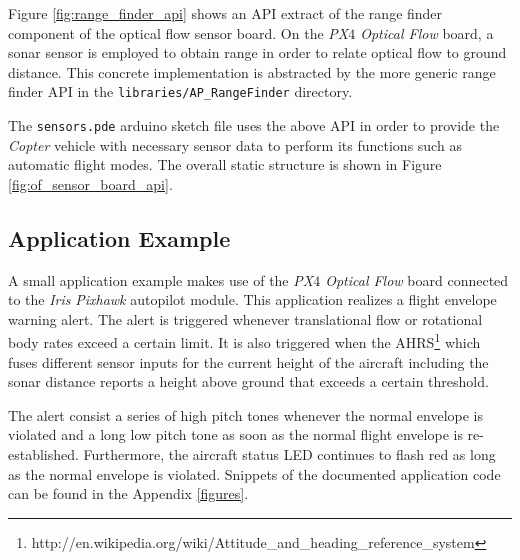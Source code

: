 \documentclass[paper=letter, fontsize=11pt]{scrartcl}
\numberwithin{equation}{section}
\numberwithin{figure}{section}
\numberwithin{table}{section}
\begin{document}
\par
Figure \ref{fig:range_finder_api} shows an \ac{API} extract of the range finder
component of the optical flow sensor board. On the {\em PX$4$ Optical Flow}
board, a sonar sensor is employed to obtain range in order to relate optical
flow to ground distance. This concrete implementation is abstracted by the
more generic range finder \ac{API} in the \texttt{libraries/AP\_RangeFinder}
directory.
\newline

\par
The \texttt{sensors.pde} arduino sketch file uses the above \ac{API} in order
to provide the {\em Copter} vehicle with necessary sensor data to perform its
functions such as automatic flight modes. The overall static structure is shown
in Figure \ref{fig:of_sensor_board_api}.
\newline

\subsection{Application Example}
\label{sec:application_example}
\par
A small application example makes use of the {\em PX$4$ Optical Flow} board
connected to the {\em Iris} {\em Pixhawk} autopilot module. This application
realizes a flight envelope warning alert. The alert is triggered whenever
translational flow or rotational body rates exceed a certain limit. It is
also triggered when the \ac{AHRS}\footnote{
http://en.wikipedia.org/wiki/Attitude\_and\_heading\_reference\_system}
which fuses different sensor inputs for the current height of the aircraft
including the sonar distance reports a height above ground that exceeds a
certain threshold.
\newline

\par
The alert consist a series of high pitch tones whenever the normal envelope
is violated and a long low pitch tone as soon as the normal flight envelope
is re-established. Furthermore, the aircraft status \ac{LED} continues to
flash red as long as the normal envelope is violated. Snippets of the
documented application code can be found in the Appendix \ref{figures}.
\end{document}
